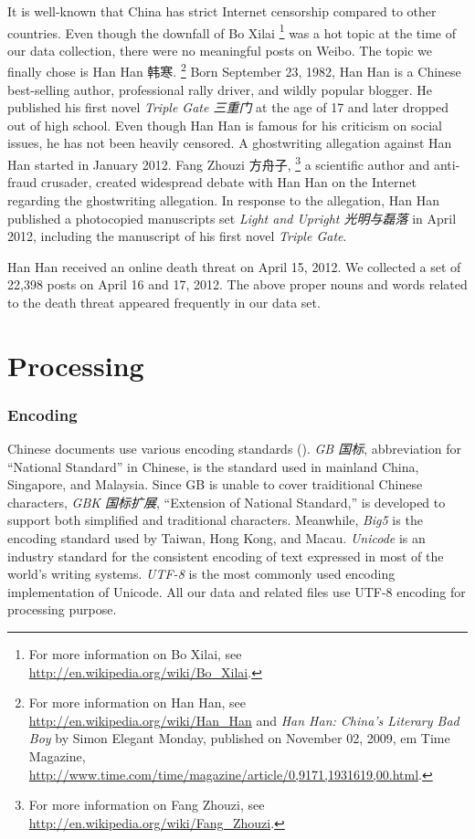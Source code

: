 \documentclass[11pt]{article}
\newcommand{\1}[1]{{\mathbf 1}\left\{#1\right\}}        %
\begin{document}
It is well-known that China has strict Internet censorship compared to other countries. Even though the downfall of Bo Xilai
\footnote{For more information on Bo Xilai, see \url{http://en.wikipedia.org/wiki/Bo_Xilai}.}
was a hot topic at the time of our data collection, there were no meaningful posts on Weibo. 
The topic we finally chose is Han Han 韩寒. 
\footnote{For more information on Han Han, see \url{http://en.wikipedia.org/wiki/Han_Han} and {\em Han Han: China's Literary Bad Boy} by Simon Elegant Monday, published on November 02, 2009, {em Time Magazine}, \url{http://www.time.com/time/magazine/article/0,9171,1931619,00.html}.}
Born September 23, 1982, Han Han
is a Chinese best-selling author, professional rally driver, and  wildly  popular blogger. He published his first novel {\em Triple Gate 三重门} at the age of 17 and later dropped out of high school. Even though Han Han is famous for his criticism on social issues, he has not been heavily censored. A ghostwriting allegation against Han Han started in January 2012. Fang Zhouzi 方舟子,
\footnote{For more information on Fang Zhouzi, see \url{http://en.wikipedia.org/wiki/Fang_Zhouzi}.}
 a scientific author and anti-fraud crusader, created widespread debate with Han Han on the Internet regarding the ghostwriting allegation. In response to the allegation, Han Han published a photocopied manuscripts set {\em Light and Upright 光明与磊落} in April 2012, including the manuscript of his first novel {\em Triple Gate}. 
 
Han Han received an online death threat on April 15, 2012. We collected a set of 22,398 posts on April 16 and 17, 2012. The above proper nouns and words related to the death threat appeared frequently in our data set. 




\section{Processing}


\subsubsection{Encoding}
Chinese documents use various encoding standards (\cite{wong2009introduction}). {\em GB 国标}, abbreviation for ``National Standard'' in Chinese, is the standard used in mainland China, Singapore, and Malaysia. Since GB is unable to cover traiditional Chinese characters, {\em GBK 国标扩展}, ``Extension of National Standard,'' is developed to support both simplified and traditional characters. Meanwhile, {\em Big5} is the encoding standard used by Taiwan, Hong Kong, and Macau. {\em Unicode} is an industry standard for the consistent encoding of text expressed in most of the world's writing systems. {\em UTF-8} is the most commonly used encoding implementation of Unicode. All our data and related files use UTF-8 encoding for processing purpose.
\end{document}
